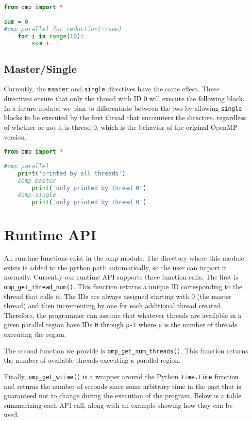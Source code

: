 \documentclass[letterpaper,12pt]{article} %
\begin{document}
\begin{lstlisting}[language=Python]
from omp import *
 
sum = 0
#omp parallel for reduction(+:sum)
	for i in range(10):
		sum += 1
\end{lstlisting}



 \subsection{Master/Single}
 Currently, the \texttt{master} and \texttt{single} directives have the same effect. These directives ensure that only the thread with ID 0 will execute the following block. In a future update, we plan to differentiate between the two by allowing \texttt{single} blocks to be executed by the first thread that encounters the directive, regardless of whether or not it is thread 0, which is the behavior of the original OpenMP version.
 
 \begin{lstlisting}[language=Python]
from omp import *
 
#omp parallel
	print('printed by all threads')
	#omp master
		print('only printed by thread 0')
	#omp single
		print('only printed by thread 0')
\end{lstlisting}
 
 \section{Runtime API}
All runtime functions exist in the omp module. The directory where this module exists is added to the python path automatically, so the user can import it normally. Currently our runtime API supports three function calls. The first is \texttt{omp\_get\_thread\_num()}. This function returns a unique ID corresponding to the thread that calls it. The IDs are always assigned starting with 0 (the master thread) and then incrementing by one for each additional thread created. Therefore, the programmer can assume that whatever threads are available in a given parallel region have IDs \texttt{0} through \texttt{p-1} where \texttt{p} is the number of threads executing the region.

The second function we provide is \texttt{omp\_get\_num\_threads()}. This function returns the number of available threads executing a parallel region.

Finally, \texttt{omp\_get\_wtime()} is a wrapper around the Python \texttt{time.time} function and returns the number of seconds since some arbitrary time in the past that is guaranteed not to change during the execution of the program. Below is a table summarizing each API call, along with an example showing how they can be used.
\end{document}
